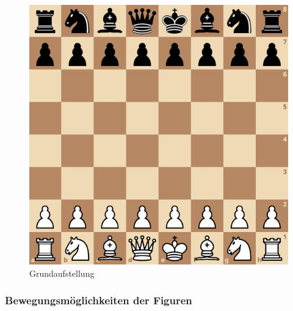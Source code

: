 \documentclass[a4paper,12pt]{article}
\begin{document}
\begin{figure}
\centering
\includegraphics{../Abbildungen/Grundaufstellung.png}
\caption{Grundaufstellung}
\end{figure}

    \hypertarget{bewegungsmuxf6glichkeiten-der-figuren}{%
\subsubsection{Bewegungsmöglichkeiten der
Figuren}\label{bewegungsmuxf6glichkeiten-der-figuren}}
\end{document}
